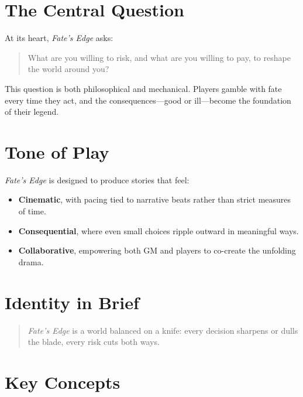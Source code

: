 \documentclass[12pt]{article}
\begin{document}
\section{The Central Question}
At its heart, \textit{Fate’s Edge} asks:  

\begin{quote}
\centering
What are you willing to risk, and what are you willing to pay, to reshape the world around you?
\end{quote}

This question is both philosophical and mechanical. Players gamble with fate every time they act, and the consequences—good or ill—become the foundation of their legend.  

\section{Tone of Play}
\textit{Fate’s Edge} is designed to produce stories that feel:  
\begin{itemize}
  \item \textbf{Cinematic}, with pacing tied to narrative beats rather than strict measures of time.  
  \item \textbf{Consequential}, where even small choices ripple outward in meaningful ways.  
  \item \textbf{Collaborative}, empowering both GM and players to co-create the unfolding drama.  
\end{itemize}

\section{Identity in Brief}
\begin{quote}
\textit{Fate’s Edge} is a world balanced on a knife:  
every decision sharpens or dulls the blade,  
every risk cuts both ways.  
\end{quote}

\section{Key Concepts}
\end{document}
